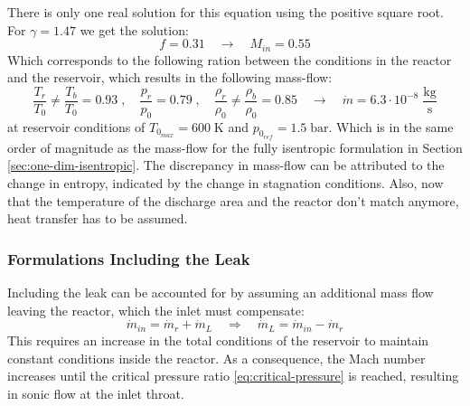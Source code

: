 	There is only one real solution for this equation using the positive square root.
	For $\gamma = 1.47$ we get the solution:
	$$
		f = 0.31
			\quad \to \quad
		M_{in} = 0.55
	$$
	Which corresponds to the following ration between the conditions in the reactor and the reservoir, which results in the following mass-flow:
	$$
		\frac{T_r}{T_0} \neq \frac{T_b}{T_0} = 0.93\;,
			\quad
		\frac{p_r}{p_0} = 0.79\;,
			\quad
		\frac{\rho_r}{\rho_0} \neq \frac{\rho_b}{\rho_0} = 0.85
			\quad \rightarrow \quad
		\dot{m} = 6.3 \cdot 10^{-8} \; \frac{\text{kg}}{\text{s}}
	$$
	at reservoir conditions of $T_{0_{max}} = 600\;\text{K}$ and $p_{0_{ref}} = 1.5\;\text{bar}$.
	Which is in the same order of magnitude as the mass-flow for the fully isentropic formulation in Section \ref{sec:one-dim-isentropic}.
	The discrepancy in mass-flow can be attributed to the change in entropy, indicated by the change in stagnation conditions.
	Also, now that the temperature of the discharge area and the reactor don't match anymore, heat transfer has to be assumed.

\subsubsection*{Formulations Including the Leak}
	Including the leak can be accounted for by assuming an additional mass flow leaving the reactor, which the inlet must compensate:
	\begin{equation}
	    \dot{m}_{in} = \dot{m}_r + \dot{m}_L 
	    \quad \Rightarrow \quad 
	    \dot{m}_L = \dot{m}_{in} - \dot{m}_r \label{eq:massflow-leak}
	\end{equation}
	This requires an increase in the total conditions of the reservoir to maintain constant conditions inside the reactor.
	As a consequence, the Mach number increases until the critical pressure ratio \eqref{eq:critical-pressure} is reached, resulting in sonic flow at the inlet throat.

